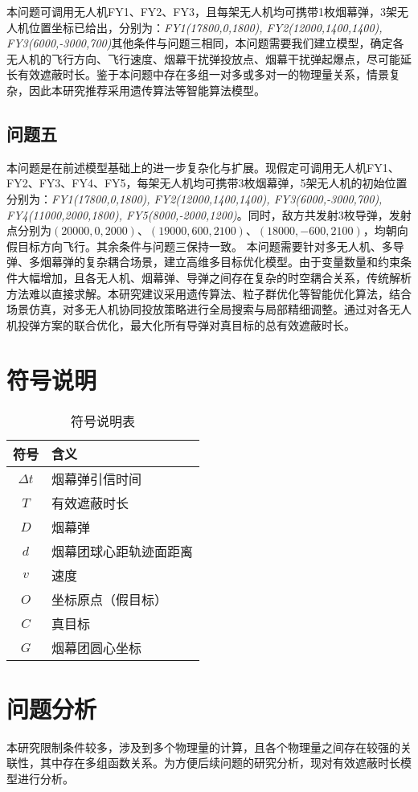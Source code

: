 \documentclass{article}
\begin{document}
本问题可调用无人机FY1、FY2、FY3，且每架无人机均可携带1枚烟幕弹，3架无人机位置坐标已给出，分别为：\textit{FY1(17800,0,1800), FY2(12000,1400,1400), FY3(6000,-3000,700)}其他条件与问题三相同，本问题需要我们建立模型，确定各无人机的飞行方向、飞行速度、烟幕干扰弹投放点、烟幕干扰弹起爆点，尽可能延长有效遮蔽时长。鉴于本问题中存在多组一对多或多对一的物理量关系，情景复杂，因此本研究推荐采用遗传算法等智能算法模型。
\subsection{问题五}
本问题是在前述模型基础上的进一步复杂化与扩展。现假定可调用无人机FY1、FY2、FY3、FY4、FY5，每架无人机均可携带3枚烟幕弹，5架无人机的初始位置分别为：\textit{FY1(17800,0,1800), FY2(12000,1400,1400), FY3(6000,-3000,700), FY4(11000,2000,1800), FY5(8000,-2000,1200)}。同时，敌方共发射3枚导弹，发射点分别为$(20000,0,2000)$、$(19000,600,2100)$、$(18000,-600,2100)$，均朝向假目标方向飞行。其余条件与问题三保持一致。
本问题需要针对多无人机、多导弹、多烟幕弹的复杂耦合场景，建立高维多目标优化模型。由于变量数量和约束条件大幅增加，且各无人机、烟幕弹、导弹之间存在复杂的时空耦合关系，传统解析方法难以直接求解。本研究建议采用遗传算法、粒子群优化等智能优化算法，结合场景仿真，对多无人机协同投放策略进行全局搜索与局部精细调整。通过对各无人机投弹方案的联合优化，最大化所有导弹对真目标的总有效遮蔽时长。
\section{符号说明}
\begin{table}[H]
\centering
\caption{符号说明表}
\begin{tabular}{|c|l|}
\hline
符号 & 含义 \\
\hline
$\Delta t$ & 烟幕弹引信时间 \\
$T$ & 有效遮蔽时长 \\
$D$ & 烟幕弹 \\
$d$ & 烟幕团球心距轨迹面距离 \\
$v$ & 速度 \\
$O$ & 坐标原点（假目标） \\
$C$ & 真目标 \\
$G$ & 烟幕团圆心坐标 \\
\hline
\end{tabular}
\end{table}

\section{问题分析}
本研究限制条件较多，涉及到多个物理量的计算，且各个物理量之间存在较强的关联性，其中存在多组函数关系。为方便后续问题的研究分析，现对有效遮蔽时长模型进行分析。
\end{document}
